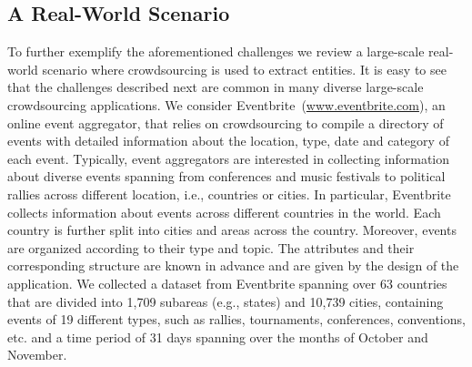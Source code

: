 \subsection{A Real-World Scenario}
\label{sec:challenges}
To further exemplify the aforementioned challenges we review a large-scale real-world scenario where crowdsourcing is used to extract entities. It is easy to see that the challenges described next are common in  many diverse large-scale crowdsourcing applications. We consider Eventbrite~(\url{www.eventbrite.com}), an online event aggregator, that relies on crowdsourcing to compile a directory of events with detailed information about the location, type, date and category of each event. Typically, event aggregators are interested in collecting information about diverse events spanning from conferences and music festivals to political rallies across different location, i.e., countries or cities. In particular, Eventbrite collects information about events across different countries in the world. Each country is further split into cities and areas across the country. Moreover, events are organized according to their type and topic. The attributes and their corresponding structure are known in advance and are given by the design of the application. We collected a dataset from Eventbrite spanning over 63 countries that are divided into 1,709 subareas (e.g., states) and 10,739 cities, containing events of 19 different types, such as rallies, tournaments, conferences, conventions, etc. and a time period of 31 days spanning over the months of October and November. 

